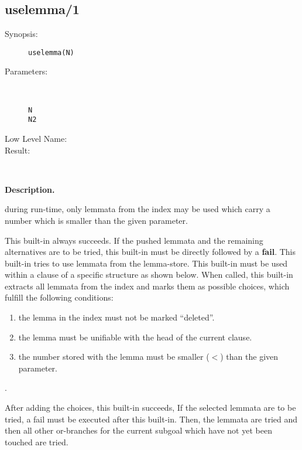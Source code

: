 %
%
%
\subsection{uselemma/1}


\begin{description}
\item[Synopsis:]
	{\tt uselemma(N)}
\item[Parameters:]\ \\[-0.5cm]
	\begin{description}
	\item[{\tt N}]
	\item[{\tt N2}]
	\end{description}
\item[Low Level Name:]
	{\tt }
\item[Result:]\ \\
\end{description}

\vspace*{0.5cm}
\noindent
{\bf Description.}
 
during run-time, only lemmata from the index may be used which carry
a number which is smaller than the given parameter.
 
 
This built-in always succeeds. If the pushed lemmata and the remaining
alternatives are to be tried, this built-in must be directly followed
by a {\bf fail}.
This built-in tries to use lemmata from the lemma-store.
This built-in must be used within a clause of a specific structure
as shown below.
When called, this built-in extracts all lemmata from the index
and marks them as possible choices, which fulfill the following conditions:
\begin{enumerate}
\item
the lemma in the index must not be marked ``deleted''.
\item
the lemma must be unifiable with the head of the current clause.
\item
the number stored with the lemma must be smaller ($<$) than the
given parameter.
\end{enumerate}.
  
After adding the choices, this built-in succeeds, If the
selected lemmata are to be tried, a fail must be executed
after this built-in.
Then, the lemmata are tried and then
all other or-branches for
the current subgoal which have not yet been touched are tried.
 
